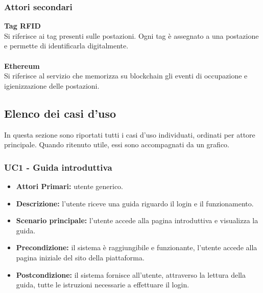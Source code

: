 \subsubsection{Attori secondari}
\textbf{Tag RFID}\\
Si riferisce ai tag presenti sulle postazioni. Ogni tag è assegnato a una postazione e permette di identificarla digitalmente.\\
\\
\textbf{Ethereum}\\
Si riferisce al servizio che memorizza su blockchain gli eventi di occupazione e igienizzazione delle postazioni.\\

\subsection{Elenco dei casi d'uso}
In questa sezione sono riportati tutti i casi d'uso individuati, ordinati per attore principale. Quando ritenuto utile, essi sono accompagnati da un grafico.
\\
\subsubsection{ UC1 - Guida introduttiva}
\begin{itemize}
           	\item\textbf{Attori Primari:} utente generico.
           	\item\textbf{Descrizione:} l'utente riceve una guida riguardo il login e il funzionamento.
           	\item\textbf{Scenario principale:} l’utente accede alla pagina introduttiva e visualizza la guida.
           	\item\textbf{Precondizione:} il sistema è raggiungibile e funzionante, l’utente accede alla pagina iniziale del sito della piattaforma.
           	\item\textbf{Postcondizione:} il sistema fornisce all’utente, attraverso la lettura della guida, tutte le istruzioni necessarie a effettuare il login.
\end{itemize}


